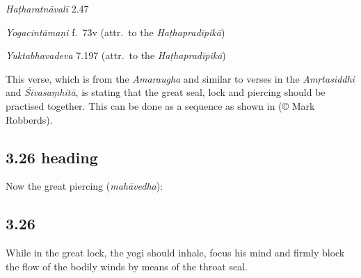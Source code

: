 \begin{ekdosis}
\begin{testimonia}[hp03_025]
\emph{Haṭharatnāvalī} 2.47
\begin{versinnote}
\tl{\var{°mahābandhau ] mahābandho \vl}\\!}
\end{versinnote}

\emph{Yogacintāmaṇi} f.~73v (attr.~to the \emph{Haṭhapradīpikā})
\begin{versinnote}
\end{versinnote}

\emph{Yuktabhavadeva} 7.197 (attr.~to the \emph{Haṭhapradīpikā})
\begin{versinnote}
\end{versinnote}
\end{testimonia}

\begin{philcomm}[hp03_025]
This verse, which is from the \emph{Amaraugha} and similar to verses in the \emph{Amṛtasiddhi} and \emph{Śivasaṃhitā}, is stating that the great seal, lock and piercing should be practised together. This can be done as a sequence as shown in  (© Mark Robberds).
\end{philcomm}

\subsection*{3.26 heading}
\begin{translation}[hp03_026a]
Now the great piercing (\emph{mahāvedha}):
\end{translation}


\subsection*{3.26}
\begin{translation}[hp03_026]
While in the great lock, the yogi should inhale, focus his mind and firmly block the flow of the bodily winds by means of the throat seal.
\end{translation}


\end{ekdosis}
